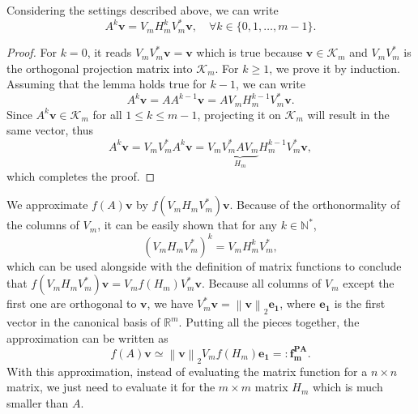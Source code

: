 \begin{lemma}
    \label{lem:krylovsubspacepowered}
    Considering the settings described above, we can write
    \begin{equation}
        A^k \mathbf{v} = V_m H_m^k V_m^* \mathbf{v}, \quad \forall k \in \{0, 1, \dots, m-1 \}.
    \end{equation}
\end{lemma}

\begin{proof}
    For $k=0$, it reads $V_m V_m^* \mathbf{v} = \mathbf{v}$ which is true because
    $\mathbf{v} \in \mathcal{K}_m$ and $V_m V_m^*$ is the orthogonal projection matrix into $\mathcal{K}_m$.
    For $k \ge 1$, we prove it by induction. Assuming that the lemma holds true for
    $k-1$, we can write
    \begin{equation*}
        A^{k} \mathbf{v} = A A^{k-1} \mathbf{v} = A V_m H_m^{k-1} V_m^* \mathbf{v}.
    \end{equation*}
    Since $A^{k} \mathbf{v} \in \mathcal{K}_m$ for all $1 \le k \le m-1$, projecting it on
    $\mathcal{K}_m$ will result in the same vector, thus
    \begin{equation*}
        A^{k} \mathbf{v} = V_m V_m^* A^{k} \mathbf{v}
        = V_m \underset{H_m}{\underbrace{V_m^* A V_m}} H_m^{k-1} V_m^* \mathbf{v},
    \end{equation*}
    which completes the proof.
\end{proof}

We approximate $f(A)\mathbf{v}$ by $f(V_m H_m V_m^*)\mathbf{v}$. Because of the orthonormality
of the columns of $V_m$, it can be easily shown that for any $k \in \mathbb{N^{*}}$,
\begin{equation*}
    \label{eq:reprojectionpower}
    (V_m H_m V_m^*)^{k} = V_m H_m^k V_m^*,
\end{equation*}
which can be used alongside with the definition of matrix functions to conclude
that $f(V_m H_m V_m^*)\mathbf{v} = V_m f(H_m) V_m^* \mathbf{v}$.
Because all columns of $V_m$ except the first one are orthogonal to $\mathbf{v}$, we have
$V_m^* \mathbf{v} = \left\| \mathbf{v} \right\|_{2} \mathbf{e_1}$, where $\mathbf{e_1}$
is the first vector in the canonical basis of $\mathbb{R}^m$.
Putting all the pieces together, the approximation can be written as
\begin{equation}
    \label{eq:polynomialkrylovapproximation}
    f(A)\mathbf{v} \simeq \left\| \mathbf{v} \right\|_{2} V_m f(H_m) \mathbf{e_1}
    =: \mathbf{f_{m}^{PA}}.
\end{equation}
With this approximation, instead of evaluating the matrix function for
a $n \times n$ matrix, we just need to evaluate it for the $m \times m$ matrix
$H_m$ which is much smaller than $A$.

